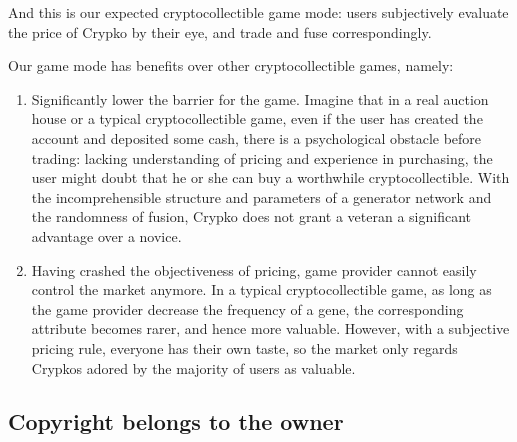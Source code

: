 \documentclass[b5paper]{article}
\begin{document}
And this is our expected cryptocollectible game mode: users subjectively evaluate the price of Crypko by their eye, and trade and fuse correspondingly.

Our game mode has benefits over other cryptocollectible games, namely:

\begin{enumerate}
    \item Significantly lower the barrier for the game. Imagine that in a real auction house or a typical cryptocollectible game, even if the user has created the account and deposited some cash, there is a psychological obstacle before trading: lacking understanding of pricing and experience in purchasing, the user might doubt that he or she can buy a worthwhile cryptocollectible. With the incomprehensible structure and parameters of a generator network and the randomness of fusion, Crypko does not grant a veteran a significant advantage over a novice.
    \item Having crashed the objectiveness of pricing, game provider cannot easily control the market anymore. In a typical cryptocollectible game, as long as the game provider decrease the frequency of a gene, the corresponding attribute becomes rarer, and hence more valuable. However, with a subjective pricing rule, everyone has their own taste, so the market only regards Crypkos adored by the majority of users as valuable.

\end{enumerate}

\subsection{Copyright belongs to the owner}
\end{document}
